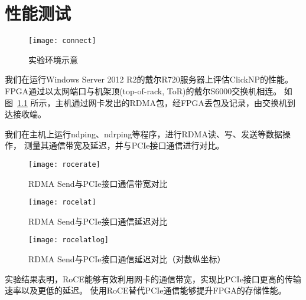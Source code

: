 \chapter{性能测试}
\begin{figure}[htbp]
\centering
\texttt{[image: connect]}
\caption{实验环境示意} \label{fig:connect}
\end{figure}
我们在运行Windows Server 2012 R2的戴尔R720服务器上评估ClickNP的性能。
FPGA通过以太网端口与机架顶(top-of-rack, ToR)的戴尔S6000交换机\cite{s6000}相连。
如图~\ref{fig:connect} 所示，主机通过网卡发出的RDMA包，经FPGA丢包及记录，由交换机到达接收端。

我们在主机上运行ndping、ndrping等程序，进行RDMA读、写、发送等数据操作，
测量其通信带宽及延迟，并与PCIe接口通信进行对比。

\begin{figure}[htbp]
\centering
\texttt{[image: rocerate]}
\caption{RDMA Send与PCIe接口通信带宽对比} \label{fig:rocerate}
\end{figure}

\begin{figure}[htbp]
\centering
\texttt{[image: rocelat]}
\caption{RDMA Send与PCIe接口通信延迟对比} \label{fig:rocelat}
\end{figure}

\begin{figure}[htbp]
\centering
\texttt{[image: rocelatlog]}
\caption{RDMA Send与PCIe接口通信延迟对比（对数纵坐标）} \label{fig:rocelatlog}
\end{figure}

实验结果表明，RoCE能够有效利用网卡的通信带宽，实现比PCIe接口更高的传输速率以及更低的延迟。
使用RoCE替代PCIe通信能够提升FPGA的存储性能。
